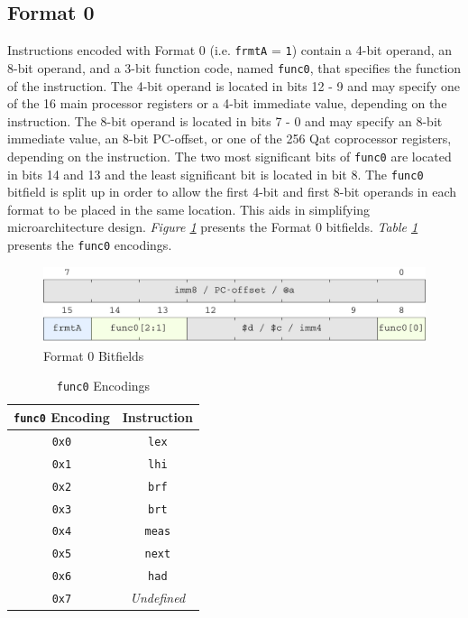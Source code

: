 \documentclass[sigconf, nonacm=true, screen=true]{acmart}
\begin{document}
\subsection{Format 0}
Instructions encoded with Format 0 (i.e. \texttt{frmtA} = \texttt{1}) contain a 4-bit operand, an 8-bit operand, and a 3-bit function code, named \texttt{func0}, that specifies the function of the instruction. The 4-bit operand is located in bits 12 - 9 and may specify one of the 16 main processor registers or a 4-bit immediate value, depending on the instruction. The 8-bit operand is located in bits 7 - 0 and may specify an 8-bit immediate value, an 8-bit PC-offset, or one of the 256 Qat coprocessor registers, depending on the instruction. The two most significant bits of \texttt{func0} are located in bits 14 and 13 and the least significant bit is located in bit 8. The \texttt{func0} bitfield is split up in order to allow the first 4-bit and first 8-bit operands in each format to be placed in the same location. This aids in simplifying microarchitecture design. \textit{Figure \ref{figure:format0-bitfields}} presents the Format 0 bitfields. \textit{Table \ref{table:func0-encodings}} presents the \texttt{func0} encodings. 

\begin{figure}[h]
    \includegraphics[width=\columnwidth]{bitfields/format0_2-lane.pdf}
    \caption{Format 0 Bitfields}
    \label{figure:format0-bitfields}
\end{figure}

\begin{center}
    \begin{table}[h]
        \begin{tabular}{cc}
            \toprule
            \texttt{func0} Encoding & Instruction \\
            \midrule
            \texttt{0x0} & \texttt{lex} \\
            \texttt{0x1} & \texttt{lhi} \\
            \texttt{0x2} & \texttt{brf} \\
            \texttt{0x3} & \texttt{brt} \\
            \texttt{0x4} & \texttt{meas} \\
            \texttt{0x5} & \texttt{next} \\
            \texttt{0x6} & \texttt{had} \\
            \texttt{0x7} & \textit{Undefined} \\
            \bottomrule
        \end{tabular}
        \caption{\texttt{func0} Encodings}
        \label{table:func0-encodings}
    \end{table}
\end{center}
\end{document}
